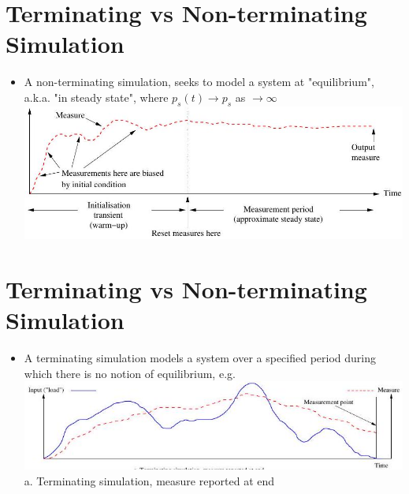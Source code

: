 \documentclass[10pt]{article}
\begin{document}
\section*{Terminating vs Non-terminating Simulation}
\begin{itemize}
  \item A non-terminating simulation, seeks to model a system at "equilibrium", a.k.a. "in steady state", where $p_{s}(t) \rightarrow p_{s}$ as $\rightarrow \infty$\\
\includegraphics[max width=\textwidth, center]{2025_05_12_520db7cd238ba7b44f0fg-16}
\end{itemize}

\section*{Terminating vs Non-terminating Simulation}
\begin{itemize}
  \item A terminating simulation models a system over a specified period during which there is no notion of equilibrium, e.g.\\
\includegraphics[max width=\textwidth, center]{2025_05_12_520db7cd238ba7b44f0fg-17}\\
a. Terminating simulation, measure reported at end
\end{itemize}
\end{document}
